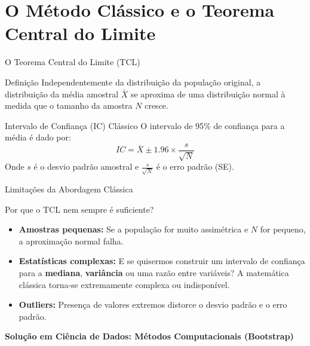 \section{O Método Clássico e o Teorema Central do Limite}

\begin{frame}{O Teorema Central do Limite (TCL)}
    \begin{block}{Definição}
        Independentemente da distribuição da população original, a distribuição da média amostral $\bar{X}$ se aproxima de uma distribuição normal à medida que o tamanho da amostra $N$ cresce.
    \end{block}
    
    \begin{block}{Intervalo de Confiança (IC) Clássico}
        O intervalo de 95\% de confiança para a média é dado por:
        $$IC = \bar{X} \pm 1.96 \times \frac{s}{\sqrt{N}}$$
        Onde $s$ é o desvio padrão amostral e $\frac{s}{\sqrt{N}}$ é o erro padrão (SE).
    \end{block}
\end{frame}

\begin{frame}{Limitações da Abordagem Clássica}
    \begin{alertblock}{Por que o TCL nem sempre é suficiente?}
        \begin{itemize}
            \item \textbf{Amostras pequenas:} Se a população for muito assimétrica e $N$ for pequeno, a aproximação normal falha.
            \item \textbf{Estatísticas complexas:} E se quisermos construir um intervalo de confiança para a \textbf{mediana}, \textbf{variância} ou uma razão entre variáveis? A matemática clássica torna-se extremamente complexa ou indisponível.
            \item \textbf{Outliers:} Presença de valores extremos distorce o desvio padrão e o erro padrão.
        \end{itemize}
    \end{alertblock}
    \centering
    \textbf{Solução em Ciência de Dados: Métodos Computacionais (Bootstrap)}
\end{frame}

